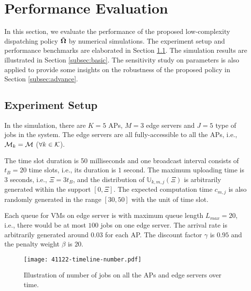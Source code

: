 \section{Performance Evaluation}
\label{sec:evaluation}
In this section, we evaluate the performance of the proposed low-complexity dispatching policy $\tilde{\boldsymbol{\Omega}}$ by numerical simulations.
The experiment setup and performance benchmarks are elaborated in Section \ref{subsec:setup}.
The simulation results are illustrated in Section \ref{subsec:basic}.
The sensitivity study on parameters is also applied to provide some insights on the robustness of the proposed policy in Section \ref{subsec:advance}.

\subsection{Experiment Setup}
\label{subsec:setup}
In the simulation, there are $K=5$ APs, $M=3$ edge servers and $J=5$ type of jobs in the system.
The edge servers are all fully-accessible to all the APs, i.e., $\mathcal{M}_{k}=\mathcal{M}$ ($\forall k\in\mathcal{K}$).

The time slot duration is 50 milliseconds and one broadcast interval consists of $t_{B}=20$ time slots, i.e., its duration is $1$ second.
The maximum uploading time is $3$ seconds, i.e., $\Xi = 3t_B$, and the distribution of $\mathbb{U}_{k,m,j}(\Xi)$ is arbitrarily generated within the support $[0, \Xi]$.
The expected computation time $c_{m,j}$ is also randomly generated in the range $[30,50]$ with the unit of time slot.

Each queue for VMs on edge server is with maximum queue length $L_{max}=20$, i.e., there would be at most $100$ jobs on one edge server.
The arrival rate is arbitrarily generated around $0.03$ for each AP.
The discount factor $\gamma$ is $0.95$ and the penalty weight $\beta$ is $20$.

\begin{figure}[ht!]                                                                             %
    \centering                                                                                  %
    \texttt{[image: 41122-timeline-number.pdf]}                           %
    \caption{Illustration of number of jobs on all the APs and edge servers over time.}         %
    \label{fig:general_timeline}                                                                %
\end{figure}                                                                                    %

